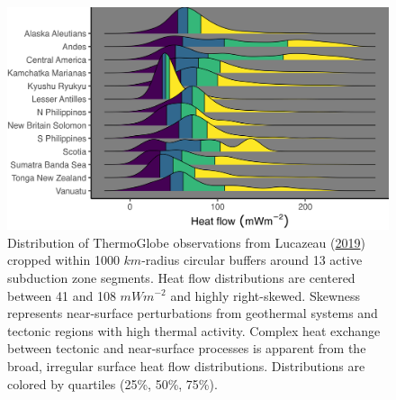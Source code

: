 \begin{figure}[htbp]

{\centering \includegraphics[width=1\linewidth,]{assets/figs/chpt3/hfSummary} 

}

\caption[Distributions of ThermoGlobe observations near 13 active subduction zone segments]{Distribution of ThermoGlobe observations from Lucazeau (\protect\hyperlink{ref-lucazeau2019}{2019}) cropped within 1000 \(km\)-radius circular buffers around 13 active subduction zone segments. Heat flow distributions are centered between 41 and 108 \(mWm^{-2}\) and highly right-skewed. Skewness represents near-surface perturbations from geothermal systems and tectonic regions with high thermal activity. Complex heat exchange between tectonic and near-surface processes is apparent from the broad, irregular surface heat flow distributions. Distributions are colored by quartiles (25\%, 50\%, 75\%).}\label{fig:hfSummaryPlot}
\end{figure}

